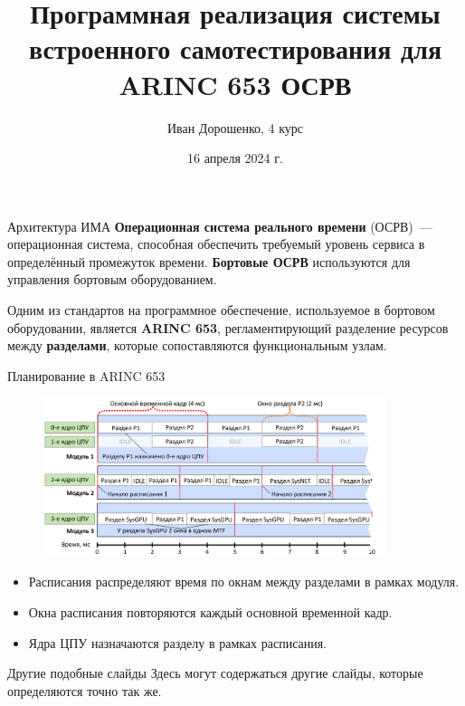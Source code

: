 \documentclass[10pt,aspectratio=169]{beamer}
\date[]{}
\title[]{Программная реализация \linebreak
системы встроенного самотестирования \linebreak
для ARINC 653 ОСРВ}
\author[]{Иван Дорошенко, 4 курс}
\date[]{16 апреля 2024 г.}
\begin{document}
\maketitle

\begin{frame}{Архитектура ИМА}
    \textbf{Операционная система реального времени} (ОСРВ)~--- операционная система, способная обеспечить требуемый уровень сервиса в определённый промежуток времени.
    \textbf{Бортовые ОСРВ} используются для управления бортовым оборудованием.
    \skipline

    Одним из стандартов на программное обеспечение, используемое в бортовом оборудовании, является \textbf{ARINC 653}, регламентирующий разделение ресурсов между \textbf{разделами}, которые сопоставляются функциональным узлам.
\end{frame}

\begin{frame}{Планирование в ARINC 653}
    \begin{figure}[H]
        \centering
        \includegraphics[width=10cm]{images/scheduling.png}
    \end{figure}
    \begin{itemize}
        \item Расписания распределяют время по окнам между разделами в рамках модуля.
        \item Окна расписания повторяются каждый основной временной кадр.
        \item Ядра ЦПУ назначаются разделу в рамках расписания.
    \end{itemize}
\end{frame}


\begin{frame}{Другие подобные слайды}
    Здесь могут содержаться другие слайды, которые определяются точно так же.
\end{frame}

\end{document}
